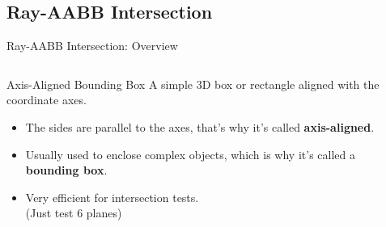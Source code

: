 \subsection{Ray-AABB Intersection}
\begin{frame}{Ray-AABB Intersection: Overview}
    \begin{columns}
        \begin{column}{0.65\textwidth}
            \begin{conceptbox}{Axis-Aligned Bounding Box}
                A simple 3D box or rectangle aligned with the coordinate axes.
                \begin{itemize}
                    \item The sides are parallel to the axes, that's why it's called \textbf{axis-aligned}.
                    \item Usually used to enclose complex objects, which is why it's called a \textbf{bounding box}.
                    \item Very efficient for intersection tests. \\
                          (Just test 6 planes)
                \end{itemize}
            \end{conceptbox}
        \end{column}
        \begin{column}{0.35\textwidth}
\end{column}
\end{columns}
\end{frame}

